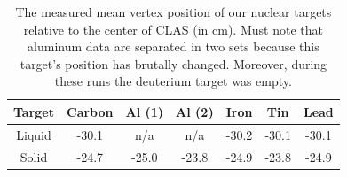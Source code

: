 \begin{table}[p]
  \centering
  \begin{tabular}{|c|c|c|c|c|c|c|}
    \hline
    Target & Carbon & Al (1) & Al (2) & Iron   & Tin    & Lead   \\ 
    \hline \hline
    Liquid & -30.1  & n/a    & n/a    & -30.2  & -30.1  & -30.1  \\ 
    Solid  & -24.7  & -25.0  & -23.8  & -24.9  & -23.8  & -24.9  \\
    \hline
  \end{tabular}
  \caption{The measured mean vertex position of our nuclear targets relative to the center of CLAS (in cm). Must note that aluminum data are separated in two sets because this target's position has brutally changed. Moreover, during these runs the deuterium target was empty.}
  \label{tab:targets}
\end{table}

